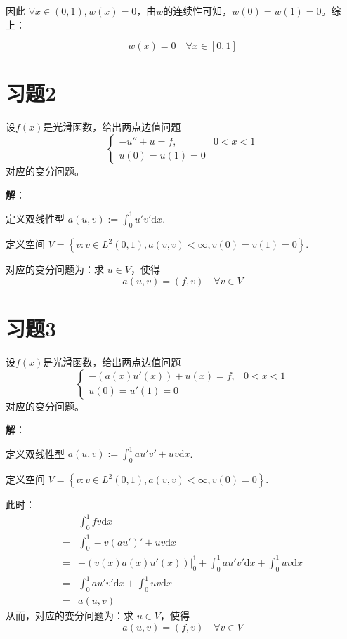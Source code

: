 \documentclass[11pt]{ctexart}
\begin{document}
因此 $\forall x \in (0, 1), w(x) = 0$，由$w$的连续性可知，$w(0) = w(1) = 0$。综上：

$$ w(x) = 0\quad \forall x \in [0, 1] $$

\section{习题2}

设$f(x)$是光滑函数，给出两点边值问题
\begin{equation}
  \begin{cases}
    -u'' + u = f,& 0 < x < 1\\
    u(0) = u(1) = 0
  \end{cases}
\end{equation}
对应的变分问题。

{\flushleft \textbf{解}：}

定义双线性型 $a(u, v) := \int_0 ^ 1 u' v' \mathrm dx$.

定义空间 $V = \left\{ v: v \in L^2(0, 1), a(v, v) < \infty, v(0) = v(1) = 0\right\}$.

对应的变分问题为：求 $u \in V$，使得
\begin{equation}
  a(u,v) = (f, v)\quad \forall v \in V
\end{equation}

\section{习题3}


设$f(x)$是光滑函数，给出两点边值问题
\begin{equation}
  \begin{cases}
    -(a(x) u'(x)) + u (x)= f,& 0 < x < 1\\
    u(0) = u'(1) = 0
  \end{cases}
\end{equation}
对应的变分问题。

{\flushleft \textbf{解}：}

定义双线性型 $a(u, v) := \int_0 ^ 1 a u' v'+ uv \mathrm dx$.

定义空间 $V = \left\{ v: v \in L^2(0, 1), a(v, v) < \infty,v(0) = 0\right\}$.

此时：
\begin{equation}
  \begin{aligned}
    & \int_0^1 f v \mathrm dx\\
   =&\int_0^1 - v(au')' + uv \mathrm dx\\
   =&-(v(x)a(x)u'(x))|^1_0 + \int_0^1 au'v'\mathrm dx + \int_0^1 uv \mathrm dx\\
   =&\int_0^1 au'v'\mathrm dx + \int_0^1 uv \mathrm dx\\
   =& a(u,v)
  \end{aligned}
\end{equation}
从而，对应的变分问题为：求 $u \in V$，使得
\begin{equation}
  a(u,v) = (f, v)\quad \forall v \in V
\end{equation}
\end{document}

